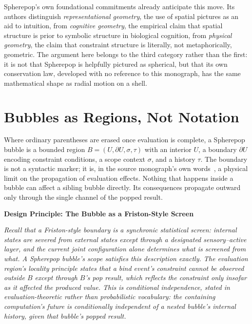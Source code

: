 \documentclass[11pt,fleqn]{book}
\numberwithin{equation}{chapter}
\newenvironment{principle}[1]
  {\begin{principleEnv}
   \noindent\textbf{Design Principle: #1}\par\smallskip\itshape}
  {\end{principleEnv}}
\theoremstyle{plain}
\theoremstyle{definition}
\theoremstyle{remark}
\begin{document}
Spherepop's own foundational commitments already anticipate this move. Its authors distinguish \emph{representational geometry}, the use of spatial pictures as an aid to intuition, from \emph{cognitive geometry}, the empirical claim that spatial structure is prior to symbolic structure in biological cognition, from \emph{physical geometry}, the claim that constraint structure is literally, not metaphorically, geometric. The argument here belongs to the third category rather than the first: it is not that Spherepop is helpfully pictured as spherical, but that its own conservation law, developed with no reference to this monograph, has the same mathematical shape as radial motion on a shell.

\section{Bubbles as Regions, Not Notation}

Where ordinary parentheses are erased once evaluation is complete, a Spherepop bubble is a bounded region \(B=(U,\partial U,\sigma,\tau)\) with an interior \(U\), a boundary \(\partial U\) encoding constraint conditions, a scope context \(\sigma\), and a history \(\tau\). The boundary is not a syntactic marker; it is, in the source monograph's own words~\cite{spherepop-geometry}, a physical limit on the propagation of evaluation effects. Nothing that happens inside a bubble can affect a sibling bubble directly. Its consequences propagate outward only through the single channel of the popped result.

\begin{principle}{The Bubble as a Friston-Style Screen}
Recall that a Friston-style boundary is a synchronic statistical screen: internal states are severed from external states except through a designated sensory--active layer, and the current joint configuration alone determines what is screened from what. A Spherepop bubble's scope satisfies this description exactly. The evaluation region's locality principle states that a bind event's constraint cannot be observed outside \(B\) except through \(B\)'s pop result, which reflects the constraint only insofar as it affected the produced value. This is conditional independence, stated in evaluation-theoretic rather than probabilistic vocabulary: the containing computation's future is conditionally independent of a nested bubble's internal history, given that bubble's popped result.
\end{principle}
\end{document}
